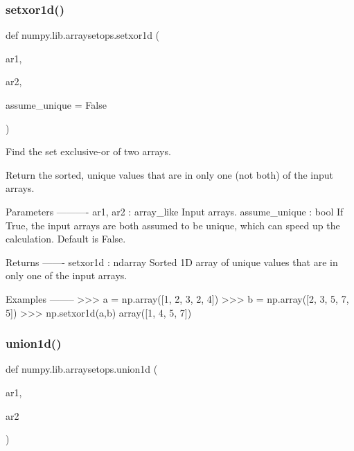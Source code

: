 \subsubsection{\texorpdfstring{setxor1d()}{setxor1d()}}
{\footnotesize\ttfamily def numpy.\+lib.\+arraysetops.\+setxor1d (\begin{DoxyParamCaption}\item[{}]{ar1,  }\item[{}]{ar2,  }\item[{}]{assume\+\_\+unique = {\ttfamily False} }\end{DoxyParamCaption})}

\begin{DoxyVerb}Find the set exclusive-or of two arrays.

Return the sorted, unique values that are in only one (not both) of the
input arrays.

Parameters
----------
ar1, ar2 : array_like
    Input arrays.
assume_unique : bool
    If True, the input arrays are both assumed to be unique, which
    can speed up the calculation.  Default is False.

Returns
-------
setxor1d : ndarray
    Sorted 1D array of unique values that are in only one of the input
    arrays.

Examples
--------
>>> a = np.array([1, 2, 3, 2, 4])
>>> b = np.array([2, 3, 5, 7, 5])
>>> np.setxor1d(a,b)
array([1, 4, 5, 7])\end{DoxyVerb}
 \mbox{\label{namespacenumpy_1_1lib_1_1arraysetops_aee4dfa0812942b38eb9cbd7da426d3b4}} 
\subsubsection{\texorpdfstring{union1d()}{union1d()}}
{\footnotesize\ttfamily def numpy.\+lib.\+arraysetops.\+union1d (\begin{DoxyParamCaption}\item[{}]{ar1,  }\item[{}]{ar2 }\end{DoxyParamCaption})}

